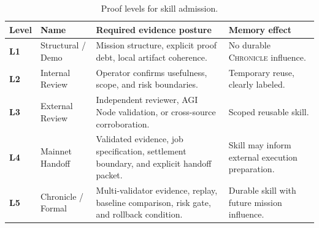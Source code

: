 \documentclass[10.5pt]{article}
\theoremstyle{goThm}
\newcommand{\chronicle}{\textsc{Chronicle}}
\begin{document}
\begin{table}[H]
\centering
\caption{Proof levels for skill admission.}
\label{tab:prooflevels}
\begin{tabularx}{\textwidth}{>{\bfseries}p{}p{}X X}
\toprule
Level & Name & Required evidence posture & Memory effect \\
\midrule
L1 & Structural / Demo & Mission structure, explicit proof debt, local artifact coherence. & No durable \chronicle{} influence. \\
L2 & Internal Review & Operator confirms usefulness, scope, and risk boundaries. & Temporary reuse, clearly labeled. \\
L3 & External Review & Independent reviewer, AGI Node validation, or cross-source corroboration. & Scoped reusable skill. \\
L4 & Mainnet Handoff & Validated evidence, job specification, settlement boundary, and explicit handoff packet. & Skill may inform external execution preparation. \\
L5 & Chronicle / Formal & Multi-validator evidence, replay, baseline comparison, risk gate, and rollback condition. & Durable skill with future mission influence. \\
\bottomrule
\end{tabularx}
\end{table}
\end{document}
